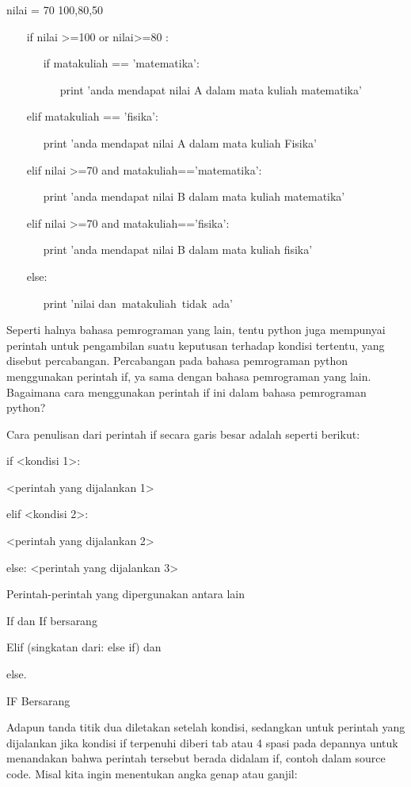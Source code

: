  nilai = 70 100,80,50 

 
~~~ if nilai >=100 or nilai>=80 : 

 
~~~~~~ if matakuliah == 'matematika': 

 
~~~~~~~~~ print 'anda mendapat nilai A dalam mata kuliah matematika' 

 
~~~ elif matakuliah == 'fisika': 

 
~~~~~~ print 'anda mendapat nilai A dalam mata kuliah Fisika' 

 
~~~ elif nilai >=70 and matakuliah=='matematika': 


 
~~~~~~ print 'anda mendapat nilai B dalam mata kuliah matematika' 

 
~~~ elif nilai >=70 and matakuliah=='fisika': 

 
~~~~~~ print 'anda mendapat nilai B dalam mata kuliah fisika' 

 
~~~ else: 

 
~~~~~~ print 'nilai dan~matakuliah~tidak~ada'~~~     

 
Seperti halnya bahasa pemrograman yang lain, tentu python juga mempunyai perintah untuk pengambilan suatu keputusan terhadap kondisi tertentu, yang disebut percabangan. Percabangan pada bahasa pemrograman python menggunakan perintah if, ya sama dengan bahasa pemrograman yang lain. Bagaimana cara menggunakan perintah if ini dalam bahasa pemrograman python? 
 

Cara penulisan dari perintah if secara garis besar adalah seperti berikut: 
 


if <kondisi 1>: 
 

   <perintah yang dijalankan 1> 
 

elif <kondisi 2>: 
 

<perintah yang dijalankan 2> 
 

else:
   <perintah yang dijalankan 3> 
 


Perintah-perintah yang dipergunakan antara lain 
 

If dan If bersarang 
 

Elif (singkatan dari: else if) dan 
 

else.
 
 

IF Bersarang 
 

Adapun tanda titik dua diletakan setelah kondisi, sedangkan untuk perintah yang dijalankan jika kondisi if terpenuhi diberi tab atau 4 spasi pada depannya untuk menandakan bahwa perintah tersebut berada didalam if, contoh dalam source code. Misal kita ingin menentukan angka genap atau ganjil: 
 


